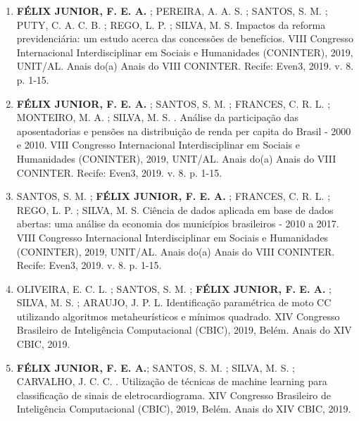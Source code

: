 \begin{enumerate}[label=(\roman*)]
    \item \textbf{FÉLIX JUNIOR, F. E. A.} ; PEREIRA, A. A. S. ; SANTOS, S. M. ; PUTY, C. A. C. B. ; REGO, L. P. ; SILVA, M. S. Impactos da reforma previdenciária: um estudo acerca das concessões de benefícios. VIII Congresso Internacional Interdisciplinar em Sociais e Humanidades (CONINTER), 2019, UNIT/AL. Anais do(a) Anais do VIII CONINTER. Recife: Even3, 2019. v. 8. p. 1-15.
    
    \item \textbf{FÉLIX JUNIOR, F. E. A.} ; SANTOS, S. M. ; FRANCES, C. R. L. ; MONTEIRO, M. A. ; SILVA, M. S. . Análise da participação das aposentadorias e pensões na distribuição de renda per capita do Brasil - 2000 e 2010. VIII Congresso Internacional Interdisciplinar em Sociais e Humanidades (CONINTER), 2019, UNIT/AL. Anais do(a) Anais do VIII CONINTER. Recife: Even3, 2019. v. 8. p. 1-15.
    
    \item SANTOS, S. M. ; \textbf{FÉLIX JUNIOR, F. E. A.} ; FRANCES, C. R. L. ; REGO, L. P. ; SILVA, M. S. Ciência de dados aplicada em base de dados abertas: uma análise da economia dos municípios brasileiros - 2010 a 2017. VIII Congresso Internacional Interdisciplinar em Sociais e Humanidades (CONINTER), 2019, UNIT/AL. Anais do(a) Anais do VIII CONINTER. Recife: Even3, 2019. v. 8. p. 1-15.
    
    \item OLIVEIRA, E. C. L. ; SANTOS, S. M. ; \textbf{FÉLIX JUNIOR, F. E. A.} ; SILVA, M. S. ; ARAUJO, J. P. L. Identificação paramétrica de moto CC utilizando algoritmos metaheurísticos e mínimos quadrado. XIV Congresso Brasileiro de Inteligência Computacional (CBIC), 2019, Belém. Anais do XIV CBIC, 2019.
    
    \item \textbf{FÉLIX JUNIOR, F. E. A.}; SANTOS, S. M. ; SILVA, M. S. ; CARVALHO, J. C. C. . Utilização de técnicas de machine learning para classificação de sinais de eletrocardiograma. XIV Congresso Brasileiro de Inteligência Computacional (CBIC), 2019, Belém. Anais do XIV CBIC, 2019.
\end{enumerate}